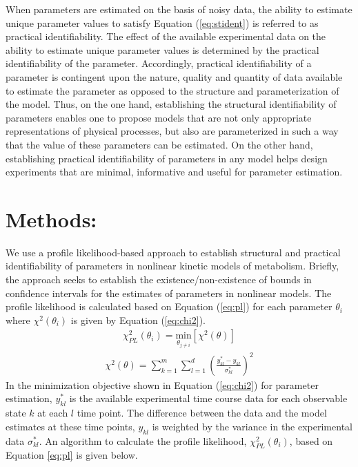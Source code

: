 \documentclass[10pt]{article}
\begin{document}
	When parameters are estimated on the basis of noisy data, the ability to estimate unique parameter values to satisfy Equation (\ref{eq:stident}) is referred to as practical identifiability. The effect of the available experimental data on the ability to estimate unique parameter values is determined by the practical identifiability of the parameter. Accordingly, practical identifiability of a parameter is contingent upon the nature, quality and quantity of data available to estimate the parameter as opposed to the structure and parameterization of the model. 
	Thus, on the one hand, establishing the structural identifiability of parameters enables one to propose models that are not only appropriate representations of physical processes, but also are parameterized in such a way that the value of these parameters can be estimated. On the other hand, establishing practical identifiability of parameters in any model helps design experiments that are minimal, informative and useful for parameter estimation.
	
	\section{Methods:}
	 We use a profile likelihood-based approach \parencite{Raue2009a} to establish structural and practical identifiability of parameters in nonlinear kinetic models of metabolism. Briefly, the approach seeks to establish the existence/non-existence of bounds in confidence intervals for the estimates of parameters in nonlinear models. The profile likelihood is calculated based on Equation (\ref{eq:pl}) for each parameter $\theta_i$ where $\chi^2(\theta_i)$ is given by Equation (\ref{eq:chi2}).
	 \begin{align}\label{eq:pl}
	 \chi_{PL}^2(\theta_i) = \underset{\theta_{j\ne i}}{\mathrm{min}} \left[\chi^2(\theta)\right]
	 \end{align}
	 \begin{align}\label{eq:chi2}
	 \chi^2(\theta) = \sum_{k=1}^{m}\sum_{l=1}^{d}\left(\frac{y_{kl}^*-y_{kl}}{\sigma_{kl}^*}\right)^2
	 \end{align}
	 In the minimization objective shown in Equation (\ref{eq:chi2}) for parameter estimation, $y_{kl}^*$ is the available experimental time course data for each observable state $k$ at each $l$ time point. The difference between the data and the model estimates at these time points, $y_{kl}$ is weighted by the variance in the experimental data $\sigma_{kl}^*$. An algorithm to calculate the profile likelihood, $\chi_{PL}^2(\theta_i)$, based on Equation \ref{eq:pl} is given below.
	 
\end{document}
